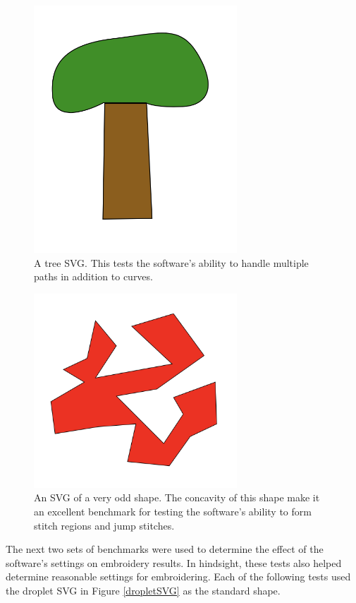 \documentclass{article}
\begin{document}
\begin{figure}[H]
    \centering
    \includegraphics[width=3in]{treeSVG}
    \caption{A tree SVG. This tests the software's ability to handle multiple paths in addition to curves.}
    \label{treeSVG}
\end{figure}

\begin{figure}[H]
    \centering
    \includegraphics[width=3in]{zigzagSVG}
    \caption{An SVG of a very odd shape. The concavity of this shape make it an excellent benchmark for testing the software's ability to form stitch regions and jump stitches.}
    \label{zigzagSVG}
\end{figure}

The next two sets of benchmarks were used to determine the effect of the software's settings on embroidery results. In hindsight, these tests also helped determine reasonable settings for embroidering. Each of the following tests used the droplet SVG in Figure \ref{dropletSVG} as the standard shape.
\end{document}

